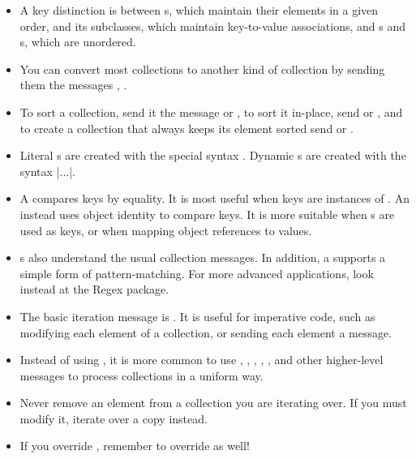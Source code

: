 \documentclass[a4paper,10pt,twoside]{book}
\begin{document}
\begin{itemize}
  \item A key distinction is between s, which maintain their elements in a given order,  and its subclasses, which maintain key-to-value associations, and s and s, which are unordered.
  \item You can convert most collections to another kind of collection by sending them the messages ,  \etc*.
  \item To sort a collection, send it the message  or , to sort it in-place, send  or , and to create a collection that always keeps its element sorted send  or .
  \item Literal s are created with the special syntax .
  Dynamic s are created with the syntax \ct|{...}|.
  \item A  compares keys by equality.
  It is most useful when keys are instances of . An  instead uses object identity to compare keys.
  It is more suitable when s are used as keys, or when mapping object references to values.
  \item {}s also understand the usual collection messages.
  In addition, a  supports a simple form of pattern-matching.
  For more advanced applications, look instead at the Regex package.
  \item The basic iteration message is .
  It is useful for imperative code, such as modifying each element of a collection, or sending each element a message.
  \item Instead of using , it is more common to use , , , , , and other higher-level messages to process collections in a uniform way.
  \item Never remove an element from a collection you are iterating over.
  If you must modify it, iterate over a copy instead.
  \item If you override \ct{=}, remember to override  as well!
\end{itemize}

\ifx\wholebook\relax\else
   
   
\end{document}
